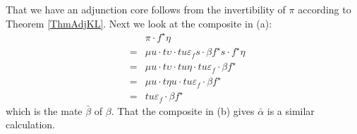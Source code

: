 \documentclass[a4paper,10pt]{article}
\newenvironment{proof}[1][Proof]{\begin{trivlist}
\item[\hskip \labelsep {\bfseries #1}]}{\end{trivlist}}
\numberwithin{equation}{section}
\begin{document}
\begin{proof} 
That we have an adjunction core follows from the invertibility of $\pi$ according to Theorem \ref{ThmAdjKL}.
Next we look at the composite in (a):
\begin{eqnarray*}
&& \pi \cdot f^{\star} \eta \\
& = & \mu u \cdot t \upsilon \cdot tu \varepsilon_f s \cdot \beta f^{\star} s \cdot f^{\star} \eta \\
& = & \mu u \cdot t \upsilon \cdot tu \eta \cdot tu \varepsilon_f \cdot \beta f^{\star} \\
& = & \mu u \cdot t \eta u \cdot tu \varepsilon_f \cdot \beta f^{\star} \\
& = & tu \varepsilon_f \cdot \beta f^{\star} 
\end{eqnarray*}
which is the mate $\bar{\beta}$ of $\beta$.
That the composite in (b) gives $\bar{\alpha}$ is a similar calculation.     


\end{proof}
\end{document}
